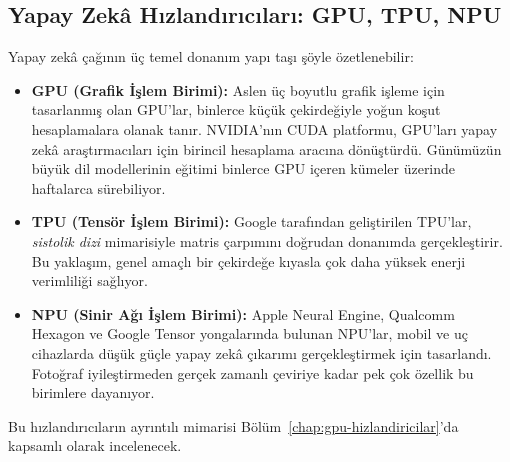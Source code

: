 \subsection{Yapay Zekâ Hızlandırıcıları: GPU, TPU, NPU}
\label{sec:yz-hizlandiricilar-giris}

Yapay zekâ çağının üç temel donanım yapı taşı şöyle özetlenebilir:

\begin{itemize}
    \item \textbf{GPU (Grafik İşlem Birimi):} Aslen üç boyutlu grafik işleme için tasarlanmış olan GPU'lar, binlerce küçük çekirdeğiyle yoğun koşut hesaplamalara olanak tanır. NVIDIA'nın CUDA platformu, GPU'ları yapay zekâ araştırmacıları için birincil hesaplama aracına dönüştürdü. Günümüzün büyük dil modellerinin eğitimi binlerce GPU içeren kümeler üzerinde haftalarca sürebiliyor.

    \item \textbf{TPU (Tensör İşlem Birimi):} Google tarafından geliştirilen TPU'lar, \emph{sistolik dizi} mimarisiyle matris çarpımını doğrudan donanımda gerçekleştirir. Bu yaklaşım, genel amaçlı bir çekirdeğe kıyasla çok daha yüksek enerji verimliliği sağlıyor.

    \item \textbf{NPU (Sinir Ağı İşlem Birimi):} Apple Neural Engine, Qualcomm Hexagon ve Google Tensor yongalarında bulunan NPU'lar, mobil ve uç cihazlarda düşük güçle yapay zekâ çıkarımı gerçekleştirmek için tasarlandı. Fotoğraf iyileştirmeden gerçek zamanlı çeviriye kadar pek çok özellik bu birimlere dayanıyor.
\end{itemize}
Bu hızlandırıcıların ayrıntılı mimarisi Bölüm~\ref{chap:gpu-hizlandiricilar}'da kapsamlı olarak incelenecek.

